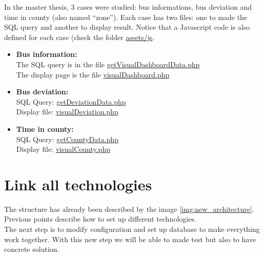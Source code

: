 \documentclass[a4paper,12pt]{article}
\begin{document}
        In the master thesis, 3 cases were studied: bus informations, bus deviation and time in county (also named ``zone''). Each case has two files: one to made the SQL query and another to display result. Notice that a Javascript code is also defined for each case (check the folder \href{https://github.com/detobel36/MobilityDBComparison/tree/master/Website/assets/js}{assets/js}.
        \begin{itemize}
            \item \textbf{Bus information:}\\
                The SQL query is in the file \href{https://github.com/detobel36/MobilityDBComparison/blob/master/Website/controllers/getVisualDashboardData.php}{getVisualDashboardData.php}\\
                The display page is the file \href{https://github.com/detobel36/MobilityDBComparison/blob/master/Website/controllers/visualDashboard.php}{visualDashboard.php}
            \item \textbf{Bus deviation:}\\
                SQL Query: \href{https://github.com/detobel36/MobilityDBComparison/blob/master/Website/controllers/getDeviationData.php}{getDeviationData.php}\\
                Display file: \href{https://github.com/detobel36/MobilityDBComparison/blob/master/Website/controllers/visualDeviation.php}{visualDeviation.php}
            \item \textbf{Time in county:}\\
                SQL Query: \href{https://github.com/detobel36/MobilityDBComparison/blob/master/Website/controllers/getCountyData.php}{getCountyData.php}\\
                Display file: \href{https://github.com/detobel36/MobilityDBComparison/blob/master/Website/controllers/visualCounty.php}{visualCounty.php}
        \end{itemize}

        
         
\section{Link all technologies}
    \label{sec:link_technologies}
    The structure has already been described by the image \ref{img:new_architecture}. Previous points describe how to set up different technologies.\\
    The next step is to modify configuration and set up database to make everything work together. With this new step we will be able to made test but also to have concrete solution.\\
    
\end{document}
